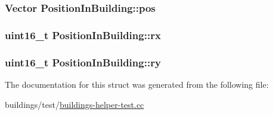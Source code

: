 \subsubsection[{\texorpdfstring{pos}{pos}}]{\setlength{\rightskip}{0pt plus 5cm}Vector Position\+In\+Building\+::pos}\hypertarget{structPositionInBuilding_a41887f00f92dbe21cdede9467303a82c}{}\label{structPositionInBuilding_a41887f00f92dbe21cdede9467303a82c}
\subsubsection[{\texorpdfstring{rx}{rx}}]{\setlength{\rightskip}{0pt plus 5cm}uint16\+\_\+t Position\+In\+Building\+::rx}\hypertarget{structPositionInBuilding_a6ad799c04d47c445f10ea9c58319ee65}{}\label{structPositionInBuilding_a6ad799c04d47c445f10ea9c58319ee65}
\subsubsection[{\texorpdfstring{ry}{ry}}]{\setlength{\rightskip}{0pt plus 5cm}uint16\+\_\+t Position\+In\+Building\+::ry}\hypertarget{structPositionInBuilding_a9fd3cce30dc7000c482ef12229cafef0}{}\label{structPositionInBuilding_a9fd3cce30dc7000c482ef12229cafef0}


The documentation for this struct was generated from the following file\+:\begin{DoxyCompactItemize}
\item 
buildings/test/\hyperlink{buildings-helper-test_8cc}{buildings-\/helper-\/test.\+cc}\end{DoxyCompactItemize}
